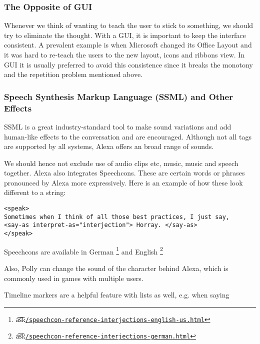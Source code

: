 \subsubsection*{The Opposite of GUI}
Whenever we think of wanting to teach the user to stick to something, we should try to eliminate the thought. With a GUI, it is important to keep the interface consistent. A prevalent example is when Microsoft changed its Office Layout and it was hard to re-teach the users to the new layout, icons and ribbons view. In GUI it is usually preferred to avoid this consistence since it breaks the monotony and the repetition problem mentioned above.

\subsubsection*{Speech Synthesis Markup Language (SSML) and Other Effects}
SSML is a great industry-standard tool to make sound variations and add human-like effects to the conversation and are encouraged. Although not all tags are supported by all systems, Alexa offers an broad range of sounds.

We should hence not exclude use of audio clips etc, music, music and speech together. Alexa also integrates Speechcons. These are certain words or phrases pronounced by Alexa more expressively. Here is an example of how these look different to a string:

\begin{verbatim}
<speak>
Sometimes when I think of all those best practices, I just say,
<say-as interpret-as="interjection"> Horray. </say-as> 
</speak>
\end{verbatim}



\noindent Speechcons are available in German \footnote{\t{a\t{sk}}\href{https://developer.amazon.com/docs/custom-skills/speechcon-reference-interjections-english-us.html}{\lstinline|/speechcon-reference-interjections-english-us.html|}} and English \footnote{\t{a\t{sk}}\href{https://developer.amazon.com/docs/custom-skills/speechcon-reference-interjections-german.html}{\lstinline|/speechcon-reference-interjections-german.html|}}

\noindent Also, Polly can change the sound of the character behind Alexa, which is commonly used in games with multiple users.

\noindent Timeline markers are a helpful feature with lists as well, e.g. when saying 

